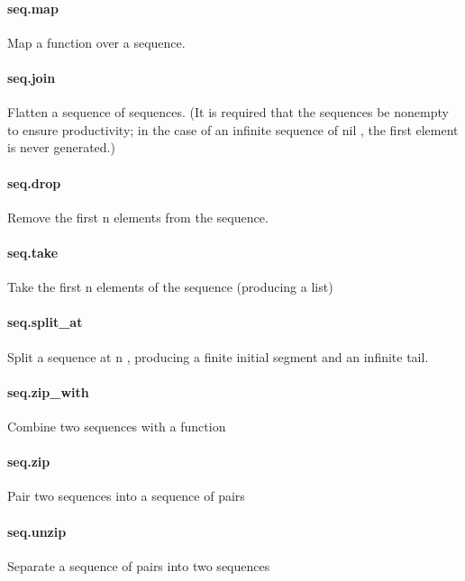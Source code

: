 \documentclass{article}
\begin{document}
\paragraph{seq.map}
\par
Map a function over a sequence.
\paragraph{seq.join}
\par
Flatten a sequence of sequences. (It is required that the
sequences be nonempty to ensure productivity; in the case
of an infinite sequence of 
\colorbox[RGB]{253,246,227}{{{{\color[RGB]{101, 123, 131} nil }}}}, the first element is never
generated.)
\paragraph{seq.drop}
\par
Remove the first 
\colorbox[RGB]{253,246,227}{{{{\color[RGB]{101, 123, 131} n }}}} elements from the sequence.
\paragraph{seq.take}
\par
Take the first 
\colorbox[RGB]{253,246,227}{{{{\color[RGB]{101, 123, 131} n }}}} elements of the sequence (producing a list)
\paragraph{seq.split\_at}
\par
Split a sequence at 
\colorbox[RGB]{253,246,227}{{{{\color[RGB]{101, 123, 131} n }}}}, producing a finite initial segment
and an infinite tail.
\paragraph{seq.zip\_with}
\par
Combine two sequences with a function
\paragraph{seq.zip}
\par
Pair two sequences into a sequence of pairs
\paragraph{seq.unzip}
\par
Separate a sequence of pairs into two sequences
\end{document}

